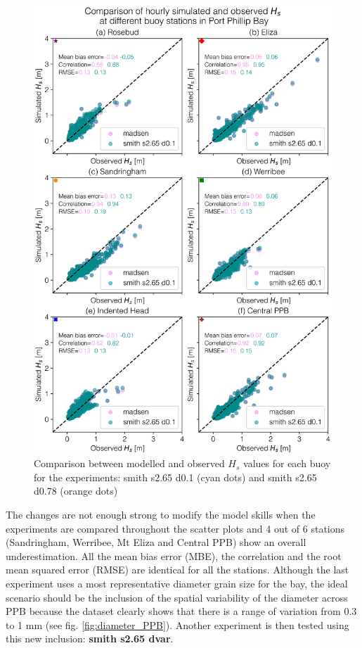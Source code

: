 \documentclass[12pt]{article}
\begin{document}
\begin{figure}[h]
    \centering
    \includegraphics[scale=0.7]{plots/scatter/madsen_vs_smith s2.65 d0.1_vert_sca.png}
    \caption{Comparison between modelled and observed $H_{s}$ values for each buoy for the experiments: smith s2.65 d0.1 (cyan dots) and smith s2.65 d0.78 (orange dots)}
    \label{fig:scatter_smith_def_vs_smith_0.78}
\end{figure}

The changes are not enough strong to modify the model skills when the experiments are compared throughout the scatter plots and 4 out of 6 stations (Sandringham, Werribee, Mt Eliza and Central PPB) show an overall underestimation. All the mean bias error (MBE), the correlation and the root mean squared error (RMSE) are identical for all the stations. Although the last experiment uses a most representative diameter grain size for the bay, the ideal scenario should be the inclusion of the spatial variability of the diameter across PPB because the dataset clearly shows that there is a range of variation from 0.3 to 1 mm (see fig. \ref{fig:diameter_PPB}). Another experiment is then tested using this new inclusion: \textbf{smith s2.65 dvar}.
\end{document}
